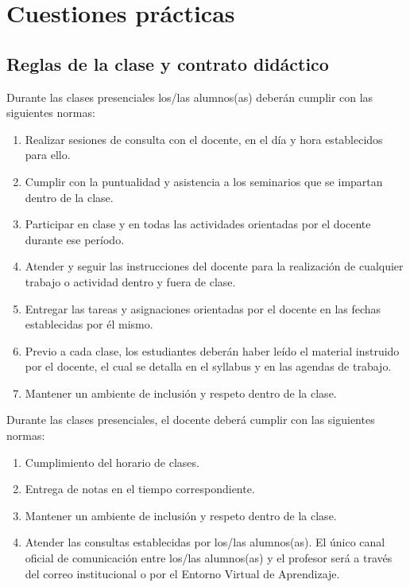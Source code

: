 \documentclass[12]{article}
\begin{document}
\newpage

\section*{Cuestiones prácticas}

\subsection*{Reglas de la clase y contrato didáctico}

Durante las clases presenciales los/las alumnos(as) deberán cumplir con las siguientes normas:
\begin{enumerate}
\item Realizar sesiones de consulta con el docente, en el día y hora establecidos para ello.
\item Cumplir con la puntualidad y asistencia a los seminarios que se impartan dentro de la clase.
\item Participar en clase y en todas las actividades orientadas por el docente durante ese período.
\item Atender y seguir las instrucciones del docente para la realización de cualquier trabajo o actividad dentro y fuera de clase.
\item Entregar las tareas y asignaciones orientadas por el docente en las fechas establecidas por él mismo.
\item Previo a cada clase, los estudiantes deberán haber leído el material instruido por el docente, el cual se detalla en el syllabus y en las agendas de trabajo. 
\item Mantener un ambiente de inclusión y respeto dentro de la clase.
\end{enumerate}
Durante las clases presenciales, el docente deberá cumplir con las siguientes normas:
\begin{enumerate}
\item Cumplimiento del horario de clases.
\item Entrega de notas en el tiempo correspondiente. 
\item Mantener un ambiente de inclusión y respeto dentro de la clase.
\item Atender las consultas establecidas por los/las alumnos(as). El único canal oficial de comunicación entre los/las alumnos(as) y el profesor será a través del correo institucional o por el Entorno Virtual de Aprendizaje. 	
\end{enumerate}

\vspace{-0.25cm}
\end{document}
